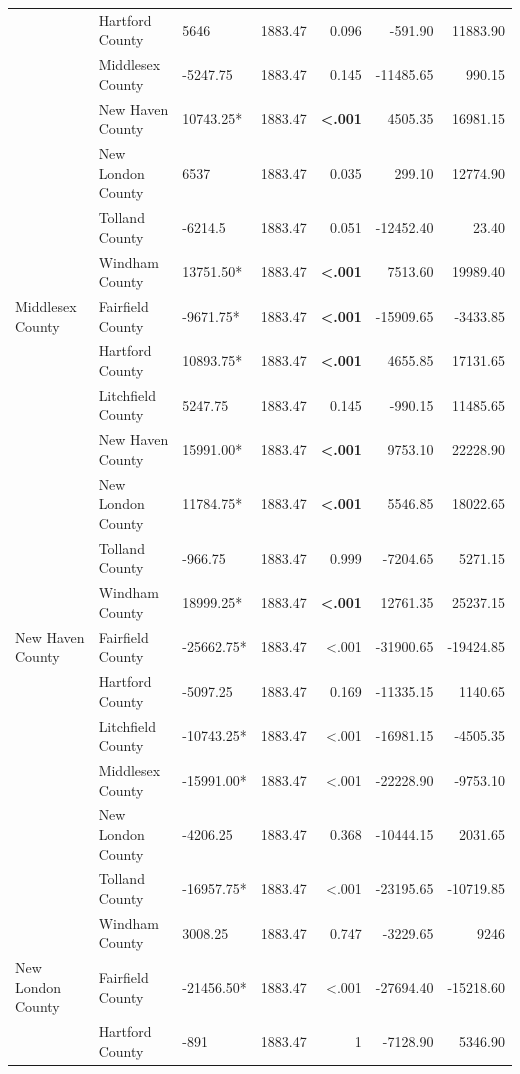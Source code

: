 \documentclass[12pt]{article}
\begin{document}
\begin{table}[htbp]
{\begin{tabular}{lllrrrr}
    & Hartford County & 5646 & 1883.47 & 0.096 & -591.90 & 11883.90 \\
    & Middlesex County & -5247.75 & 1883.47 & 0.145 & -11485.65 & 990.15 \\
    & New Haven County & 10743.25* & 1883.47 & \textbf{<.001} & 4505.35 & 16981.15 \\
    & New London County & 6537 & 1883.47 & 0.035 & 299.10 & 12774.90 \\
    & Tolland County & -6214.5 & 1883.47 & 0.051 & -12452.40 & 23.40 \\
    & Windham County & 13751.50* & 1883.47 & \textbf{<.001} & 7513.60 & 19989.40 \\
    \midrule
    Middlesex County & Fairfield County & -9671.75* & 1883.47 & \textbf{<.001} & -15909.65 & -3433.85 \\
    & Hartford County & 10893.75* & 1883.47 & \textbf{<.001} & 4655.85 & 17131.65 \\
    & Litchfield County & 5247.75 & 1883.47 & 0.145 & -990.15 & 11485.65 \\
    & New Haven County & 15991.00* & 1883.47 & \textbf{<.001} & 9753.10 & 22228.90 \\
    & New London County & 11784.75* & 1883.47 & \textbf{<.001} & 5546.85 & 18022.65 \\
    & Tolland County & -966.75 & 1883.47 & 0.999 & -7204.65 & 5271.15 \\
    & Windham County & 18999.25* & 1883.47 & \textbf{<.001} & 12761.35 & 25237.15 \\
    \midrule
    New Haven County & Fairfield County & -25662.75* & 1883.47 & <.001 & -31900.65 & -19424.85 \\
    & Hartford County & -5097.25 & 1883.47 & 0.169 & -11335.15 & 1140.65 \\
    & Litchfield County & -10743.25* & 1883.47 & <.001 & -16981.15 & -4505.35 \\
    & Middlesex County & -15991.00* & 1883.47 & <.001 & -22228.90 & -9753.10 \\
    & New London County & -4206.25 & 1883.47 & 0.368 & -10444.15 & 2031.65 \\
    & Tolland County & -16957.75* & 1883.47 & <.001 & -23195.65 & -10719.85 \\
    & Windham County & 3008.25 & 1883.47 & 0.747 & -3229.65 & 9246 \\
    \midrule
    New London County & Fairfield County & -21456.50* & 1883.47 & <.001 & -27694.40 & -15218.60 \\
    & Hartford County & -891 & 1883.47 & 1 & -7128.90 & 5346.90 \\

\end{tabular}}
\end{table}
\end{document}
